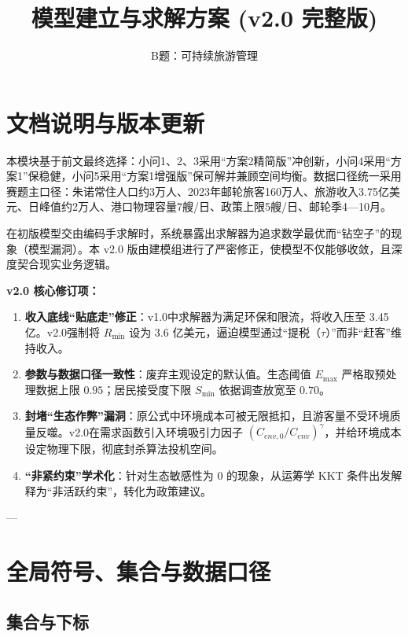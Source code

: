 \documentclass[UTF8,a4paper,12pt]{ctexart}
\title{\textbf{模型建立与求解方案 (v2.0 完整版)}}
\author{B题：可持续旅游管理}
\date{}
\begin{document}
\maketitle
\tableofcontents
\newpage

\section*{文档说明与版本更新}

本模块基于前文最终选择：小问1、2、3采用“方案2精简版”冲创新，小问4采用“方案1”保稳健，小问5采用“方案1增强版”保可解并兼顾空间均衡。数据口径统一采用赛题主口径：朱诺常住人口约3万人、2023年邮轮旅客160万人、旅游收入3.75亿美元、日峰值约2万人、港口物理容量7艘/日、政策上限5艘/日、邮轮季4—10月。

在初版模型交由编码手求解时，系统暴露出求解器为追求数学最优而“钻空子”的现象（模型漏洞）。本 v2.0 版由建模组进行了严密修正，使模型不仅能够收敛，且深度契合现实业务逻辑。

\begin{revisionbox}
\textbf{v2.0 核心修订项：}
\begin{enumerate}
    \item \textbf{收入底线“贴底走”修正}：v1.0中求解器为满足环保和限流，将收入压至 3.45 亿。v2.0强制将 \(R_{\min}\) 设为 3.6 亿美元，逼迫模型通过“提税（\(\tau\)）”而非“赶客”维持收入。
    \item \textbf{参数与数据口径一致性}：废弃主观设定的默认值。生态阈值 \(E_{\max}\) 严格取预处理数据上限 \(0.95\)；居民接受度下限 \(S_{\min}\) 依据调查放宽至 \(0.70\)。
    \item \textbf{封堵“生态作弊”漏洞}：原公式中环境成本可被无限抵扣，且游客量不受环境质量反噬。v2.0在需求函数引入环境吸引力因子 \((C_{env,0}/C_{env})^\gamma\)，并给环境成本设定物理下限，彻底封杀算法投机空间。
    \item \textbf{“非紧约束”学术化}：针对生态敏感性为 0 的现象，从运筹学 KKT 条件出发解释为“非活跃约束”，转化为政策建议。
\end{enumerate}
\end{revisionbox}

---

\section{全局符号、集合与数据口径}

\subsection{集合与下标}
\end{document}
